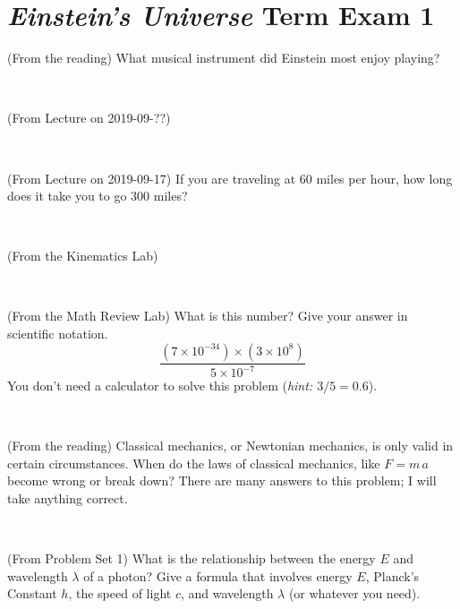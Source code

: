 \documentclass[12pt, letterpaper]{article}
\begin{document}
\section*{\textsl{Einstein's Universe} Term Exam 1}
\setcounter{problem}{1}


\begin{problem} (From the reading)
What musical instrument did Einstein most enjoy playing?
\end{problem}


\vfill ~

\begin{problem} (From Lecture on 2019-09-??)
\end{problem}


\vfill ~

\begin{problem} (From Lecture on 2019-09-17)
If you are traveling at 60 miles per hour, how long does
it take you to go 300 miles?
\end{problem}


\vfill ~

\begin{problem} (From the Kinematics Lab)

\end{problem}


\vfill ~


\clearpage


\begin{problem} (From the Math Review Lab)
What is this number? Give your answer in scientific notation.
$$
\frac{(7\times10^{-34})\times(3\times10^8)}{5\times10^{-7}}
$$
You don't need a calculator to solve this problem (\textit{hint: $3/5=0.6$}).
\end{problem}


\vfill ~

\begin{problem} (From the reading)
Classical mechanics, or Newtonian mechanics, is only valid in certain
circumstances. When do the laws of classical mechanics, like $F =
m\,a$ become wrong or break down? There are many answers to this
problem; I will take anything correct.
\end{problem}


\vfill ~

\begin{problem} (From Problem Set 1)
What is the relationship between the energy $E$ and wavelength
$\lambda$ of a photon? Give a formula that involves energy $E$,
Planck's Constant $h$, the speed of light $c$, and wavelength
$\lambda$ (or whatever you need).
\end{problem}
\end{document}
